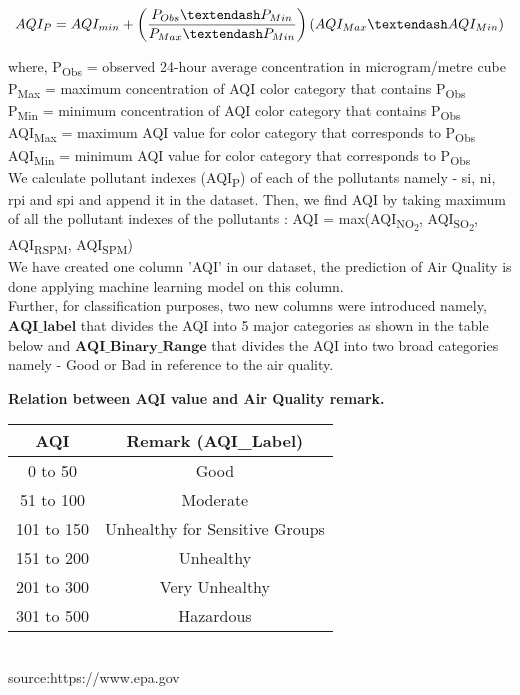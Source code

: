\documentclass{article}
\begin{document}
\begin{itemize}
\begin{itemize}
    \[AQI_{P} = AQI_{min} +\left(\frac{P_{Obs} \textendash P_{Min}}{P_{Max} \textendash P_{Min}}\right)
(AQI_{Max} \textendash AQI_{Min})\]
    
    where, P\textsubscript{Obs} = observed 24-hour average concentration in microgram/metre cube\\
    P\textsubscript{Max} = maximum concentration of AQI color category that contains P\textsubscript{Obs}\\
    P\textsubscript{Min} = minimum concentration of AQI color category that contains P\textsubscript{Obs}\\
    AQI\textsubscript{Max} = maximum AQI value for color category that corresponds to P\textsubscript{Obs}\\
    AQI\textsubscript{Min} = minimum AQI value for color category that corresponds to P\textsubscript{Obs}\\
    We calculate pollutant indexes (AQI\textsubscript{P}) of each of the pollutants namely - si, ni, rpi and spi
    and append it in the dataset. Then, we find AQI by taking maximum of all the pollutant
    indexes of the pollutants :
    AQI = max(AQI\textsubscript{NO\textsubscript{2}}, AQI\textsubscript{SO\textsubscript{2}}, AQI\textsubscript{RSPM}, AQI\textsubscript{SPM})\\
    We have created one column ’AQI’ in our dataset, the prediction of Air Quality is done applying machine learning model on this column.  \\
    Further, for classification purposes, two new columns were introduced namely, $\textbf{AQI\_label}$ that divides the AQI into 5 major categories as shown in the table below and $\textbf{AQI\_Binary\_Range}$ that divides the AQI into two broad categories namely - Good or Bad in reference to the air quality. 
    \newpage
    \begin{center}
        \textbf{Relation between AQI value and Air Quality remark.}\\
        \vspace{3mm}
        \begin{tabular}{ |c|c| }
        \hline
        AQI&Remark (AQI\_Label)\\
        \hline
        0 to 50&Good\\
        51 to 100&Moderate\\
        101 to 150&Unhealthy for Sensitive Groups\\
        151 to 200&Unhealthy\\
        201 to 300&Very Unhealthy\\
        301 to 500&Hazardous\\
        \hline
        \end{tabular}\\
        source:https://www.epa.gov
        
    \end{center}
\end{itemize}
\end{itemize}
\end{document}
